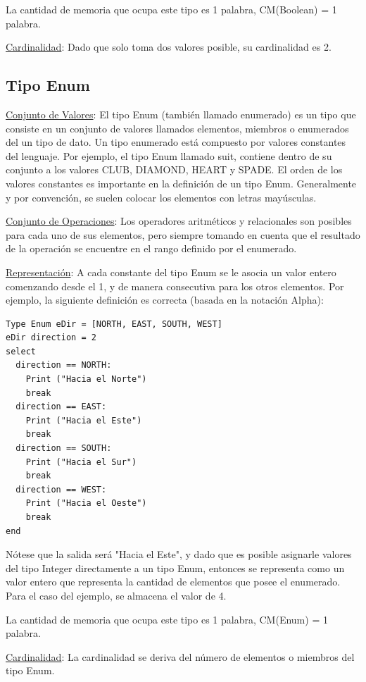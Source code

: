La cantidad de memoria que ocupa este tipo es 1 palabra, CM(Boolean) = 1 palabra.

\underline{Cardinalidad}: Dado que solo toma dos valores posible, su cardinalidad es 2.

\subsection{Tipo Enum}

\underline{Conjunto de Valores}: El tipo Enum (también llamado enumerado) es un tipo que consiste en un conjunto de valores llamados elementos, miembros o enumerados del un tipo de dato. Un tipo enumerado está compuesto por valores constantes del lenguaje. Por ejemplo, el tipo Enum llamado suit, contiene dentro de su conjunto a los valores CLUB, DIAMOND, HEART y SPADE. El orden de los valores constantes es importante en la definición de un tipo Enum. Generalmente y por convención, se suelen colocar los elementos con letras mayúsculas.

\underline{Conjunto de Operaciones}: Los operadores aritméticos y relacionales son posibles para cada uno de sus elementos, pero siempre tomando en cuenta que el resultado de la operación se encuentre en el rango definido por el enumerado.

\underline{Representación}: A cada constante del tipo Enum se le asocia un valor entero comenzando desde el 1, y de manera consecutiva para los otros elementos. Por ejemplo, la siguiente definición es correcta (basada en la notación Alpha):
\begin{lstlisting}[upquote=true, language=pseudo]
Type Enum eDir = [NORTH, EAST, SOUTH, WEST]
eDir direction = 2
select
  direction == NORTH: 
    Print ("Hacia el Norte")
    break
  direction == EAST: 
    Print ("Hacia el Este")
    break
  direction == SOUTH: 
    Print ("Hacia el Sur")
    break
  direction == WEST: 
    Print ("Hacia el Oeste")
    break
end
\end{lstlisting}

Nótese que la salida será "Hacia el Este", y dado que es posible asignarle valores del tipo Integer directamente a un tipo Enum, entonces se representa como un valor entero que representa la cantidad de elementos que posee el enumerado. Para el caso del ejemplo, se almacena el valor de 4.

La cantidad de memoria que ocupa este tipo es 1 palabra, CM(Enum) = 1 palabra.

\underline{Cardinalidad}: La cardinalidad se deriva del número de elementos o miembros del tipo Enum.

